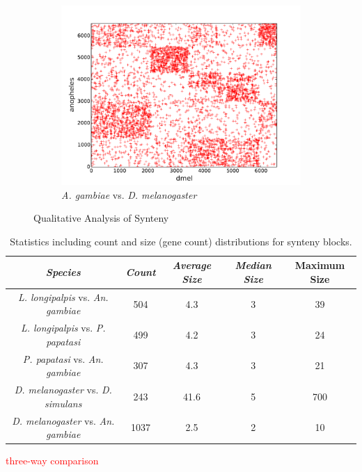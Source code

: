 \begin{figure}[H]
\begin{subfigure}[b]{0.45\textwidth}
    \includegraphics[width=\textwidth]{figures/synteny/dmel_anopheles_plot}
    \caption{\emph{A. gambiae} vs. \emph{D. melanogaster}}
    \label{fig:synteny-dotplots-anopheles-drosophila}
  \end{subfigure}
\label{fig:dot-plots}
\caption{Qualitative Analysis of Synteny}
\end{figure}

\begin{table}[H]
  \centering
  \begin{tabular}{c c c c c} \hline
    \emph{Species} & \emph{Count} & \emph{Average Size} & \emph{Median Size} & {Maximum Size} \\ \hline
    \emph{L. longipalpis} vs. \emph{An. gambiae} & 504 & 4.3 & 3 & 39 \\
    \emph{L. longipalpis} vs. \emph{P. papatasi} & 499 & 4.2 & 3 & 24 \\
    \emph{P. papatasi} vs. \emph{An. gambiae} & 307 & 4.3 & 3 & 21 \\
    \emph{D. melanogaster} vs. \emph{D. simulans} & 243 & 41.6 & 5 & 700 \\
    \emph{D. melanogaster} vs. \emph{An. gambiae} & 1037 & 2.5 & 2 & 10
  \end{tabular}
  \caption{Statistics including count and size (gene count) distributions for synteny blocks.}
  \label{tab:synteny-block-stats}
\end{table}


\textcolor{red}{three-way comparison}

